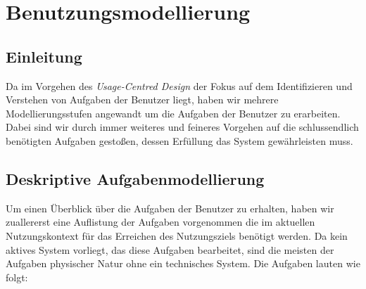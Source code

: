 \section{Benutzungsmodellierung}
\label{sec:Benutzungsmodellierung}

\subsection{Einleitung}
\label{sec:Benutzungsmodellierung_Einleitung}

Da im Vorgehen des \textit{Usage-Centred Design} der Fokus auf dem
Identifizieren und Verstehen von Aufgaben der Benutzer liegt, haben wir mehrere
Modellierungsstufen angewandt um die Aufgaben der Benutzer zu erarbeiten.
Dabei sind wir durch immer weiteres und feineres Vorgehen auf die schlussendlich
benötigten Aufgaben gestoßen, dessen Erfüllung das System gewährleisten muss.

\subsection{Deskriptive Aufgabenmodellierung}
\label{sec:Deskriptive_Aufgabenmodellierung}
Um einen Überblick über die Aufgaben der Benutzer zu erhalten, haben wir
zuallererst eine Auflistung der Aufgaben vorgenommen die im aktuellen
Nutzungskontext für das Erreichen des Nutzungsziels benötigt werden. 
Da kein aktives System vorliegt, das diese Aufgaben bearbeitet, sind die 
meisten der Aufgaben physischer Natur ohne ein technisches System. 
Die Aufgaben lauten wie folgt:

